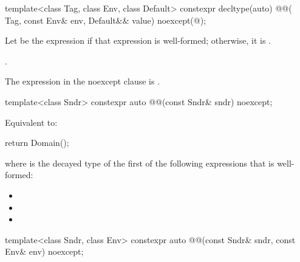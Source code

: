 \begin{itemdecl}
template<class Tag, class Env, class Default>
  constexpr decltype(auto) @@(
    Tag, const Env& env, Default&& value) noexcept(@\seebelow@);
\end{itemdecl}

\begin{itemdescr}
\pnum
Let  be the expression 
if that expression is well-formed;
otherwise, it is .

\pnum
\returns
{}.

\pnum
\remarks
The expression in the noexcept clause is .
\end{itemdescr}

\begin{itemdecl}
template<class Sndr>
  constexpr auto @@(const Sndr& sndr) noexcept;
\end{itemdecl}

\begin{itemdescr}
\pnum
\effects
Equivalent to:
\begin{codeblock}
return Domain();
\end{codeblock}
where  is
the decayed type of the first of the following expressions that is well-formed:
\begin{itemize}
\item {}
\item {}
\item {}
\end{itemize}
\end{itemdescr}

\begin{itemdecl}
template<class Sndr, class Env>
  constexpr auto @@(const Sndr& sndr, const Env& env) noexcept;
\end{itemdecl}


